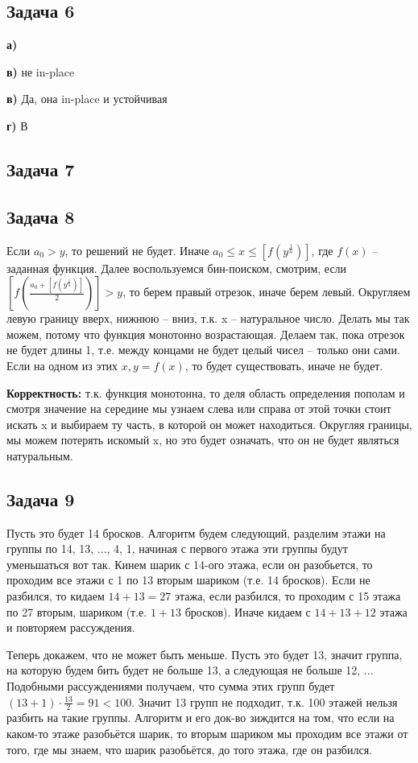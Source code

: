 \documentclass[a4paper,14pt]{article} %
\begin{document}
\subsection{Задача 6}
\textbf{а)}

\textbf{в)} не in-place

\textbf{в)} Да, она in-place и устойчивая

\textbf{г)} В

\subsection{Задача 7}

\subsection{Задача 8}
Если $a_0 > y$, то решений не будет.
Иначе $a_0 \leq x \leq [f(y^{\frac{1}{n}})]$, где $f(x)$ -- заданная функция.
Далее воспользуемся бин-поиском, смотрим, если $[f(\frac{a_0 + [f(y^{\frac{1}{n}})]}{2})] > y$, то берем правый отрезок, иначе берем левый.
Округляем левую границу вверх, нижнюю -- вниз, т.к. x -- натуральное число. Делать мы так можем, потому что функция монотонно возрастающая. 
Делаем так, пока отрезок не будет длины 1, т.е. между концами не будет целый чисел -- только они сами. Если на одном из этих $x, y = f(x)$, то будет существовать, иначе не будет.

\textbf{Корректность:} т.к. функция монотонна, то деля область определения пополам и смотря значение на середине мы узнаем слева или справа от этой точки стоит искать x и выбираем ту часть, 
в которой он может находиться. Округляя границы, мы можем потерять искомый x, но это будет означать, что он не будет являться натуральным. 

\subsection{Задача 9}
Пусть это будет 14 бросков. 
Алгоритм будем следующий, разделим этажи на группы по 14, 13, ..., 4, 1, начиная с первого этажа эти группы будут уменьшаться вот так.
Кинем шарик с 14-ого этажа, если он разобьется, то проходим все этажи с 1 по 13 вторым шариком (т.е. 14 бросков). Если не разбился, то кидаем $14 + 13 = 27$ этажа, 
если разбился, то проходим с 15 этажа по 27 вторым, шариком (т.е. $1 + 13$ бросков). Иначе кидаем с $14+13+12$ этажа и повторяем рассуждения.

Теперь докажем, что не может быть меньше. Пусть это будет 13, значит группа, на которую будем бить будет не больше 13, а следующая не больше 12, ...
Подобными рассуждениями получаем, что сумма этих групп будет $(13 + 1) \cdot \frac{13}{2} = 91 < 100$.
Значит 13 групп не подходит, т.к. 100 этажей нельзя разбить на такие группы. 
Алгоритм и его док-во зиждится на том, что если на каком-то этаже разобьётся шарик, то вторым шариком мы проходим все этажи от того, где мы знаем, что шарик разобьётся, до того этажа, где он разбился.
\end{document}
